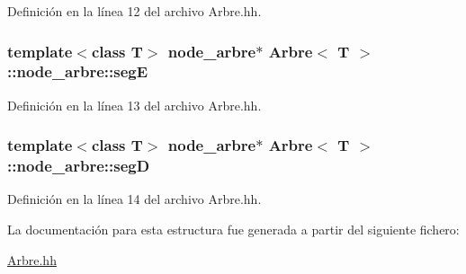 Definición en la línea 12 del archivo Arbre.\+hh.

\subsubsection[{\texorpdfstring{segE}{segE}}]{\setlength{\rightskip}{0pt plus 5cm}template$<$class T$>$ {\bf node\+\_\+arbre}$\ast$ {\bf Arbre}$<$ T $>$\+::node\+\_\+arbre\+::segE}\hypertarget{struct_arbre_1_1node__arbre_add2e7f2ee789db9f38a3bf2d2dd36972}{}\label{struct_arbre_1_1node__arbre_add2e7f2ee789db9f38a3bf2d2dd36972}


Definición en la línea 13 del archivo Arbre.\+hh.

\subsubsection[{\texorpdfstring{segD}{segD}}]{\setlength{\rightskip}{0pt plus 5cm}template$<$class T$>$ {\bf node\+\_\+arbre}$\ast$ {\bf Arbre}$<$ T $>$\+::node\+\_\+arbre\+::segD}\hypertarget{struct_arbre_1_1node__arbre_a9986e206810ba9e519b5b6e590238093}{}\label{struct_arbre_1_1node__arbre_a9986e206810ba9e519b5b6e590238093}


Definición en la línea 14 del archivo Arbre.\+hh.



La documentación para esta estructura fue generada a partir del siguiente fichero\+:\begin{DoxyCompactItemize}
\item 
\hyperlink{_arbre_8hh}{Arbre.\+hh}\end{DoxyCompactItemize}
